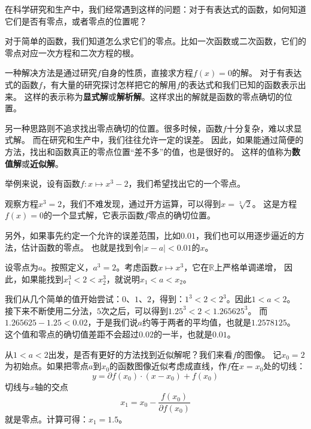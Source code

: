 \documentclass[12pt,UTF8]{ctexbook}
\begin{document}
在科学研究和生产中，我们经常遇到这样的问题：对于有表达式的函数，如何知道它们是否有零点，或者零点的位置呢？

对于简单的函数，我们知道怎么求它们的零点。比如一次函数或二次函数，它们的零点对应一次方程和二次方程的根。

一种解决方法是通过研究$f$自身的性质，直接求方程$f(x) = 0$的解。
对于有表达式的函数$f$，有大量的研究探讨怎样把它的解用$f$的表达式和我们已知的函数表示出来。
这样的表示称为\textbf{显式解}或\textbf{解析解}。这样求出的解就是函数的零点确切的位置。

另一种思路则不追求找出零点确切的位置。很多时候，函数$f$十分复杂，难以求显式解。
而在研究和生产中，我们往往允许一定的误差。
因此，如果能通过简便的方法，找出和函数真正的零点位置“差不多”的值，也是很好的。
这样的值称为\textbf{数值解}或\textbf{近似解}。

举例来说，设有函数$f: x\mapsto x^3 - 2$，我们希望找出它的一个零点。

观察方程$x^3 = 2$，我们不难发现，通过开方运算，可以得到$x = \sqrt[3]{2}$。
这是方程$f(x) = 0$的一个显式解，它表示函数$f$零点的确切位置。

另外，如果事先约定一个允许的误差范围，比如$0.01$，我们也可以用逐步逼近的方法，估计函数的零点。
也就是找到令$|x - a| < 0.01$的$x$。

设零点为$a$。按照定义，$a^3 = 2$。考虑函数$x\mapsto x^3$，它在$\mathbb{R}$上严格单调递增，
因此，如果能找到$x_1^3 < 2 < x_2^3$，就说明$x_1 < a < x_2$。

我们从几个简单的值开始尝试：$0$、$1$、$2$，得到：$1^3 < 2 < 2^3$。因此$1 < a < 2$。
接下来不断使用二分法，$5$次之后，可以得到$1.25^3 < 2 < 1.265625^3$。
而$1.265625 - 1.25 < 0.02$，于是我们说$a$约等于两者的平均值，也就是$1.2578125$。
这个值和零点的确切值差距不会超过$0.02$的一半，也就是$0.01$。

从$1 < a < 2$出发，是否有更好的方法找到近似解呢？我们来看$f$的图像。
记$x_0 = 2$为初始点。如果把零点$a$到$x_0$的函数图像近似考虑成直线，作$f$在$x=x_0$处的切线：
$$ y = \partial f(x_0)\cdot (x - x_0) + f(x_0) $$
切线与$x$轴的交点
$$ x_1 = x_0 - \frac{f(x_0)}{\partial f(x_0)} $$
就是零点。计算可得：$x_1 = 1.5$。
\end{document}
